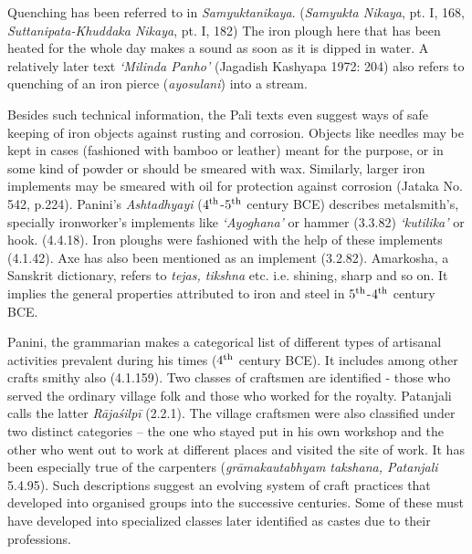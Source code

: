 Quenching has been referred to in {\it Samyuktanikaya}. ({\it Samyukta Nikaya}, pt. I, 168, {\it Suttanipata-Khuddaka Nikaya}, pt. I, 182) The iron plough here that has been heated for the whole day makes a sound as soon as it is dipped in water. A relatively later text {\it ‘Milinda Panho’} (Jagadish Kashyapa 1972: 204) also refers to quenching of an iron pierce ({\it ayosulani}) into a stream.

Besides such technical information, the Pali texts even suggest ways of safe keeping of iron objects against rusting and corrosion. Objects like needles may be kept in cases (fashioned with bamboo or leather) meant for the purpose, or in some kind of powder or should be smeared with wax. Similarly, larger iron implements may be smeared with oil for protection against corrosion (Jataka No. 542, p.224). Panini’s {\it Ashtadhyayi} ($4^{\rm th}$-$5^{\rm th}$ century BCE) describes metalsmith’s, specially ironworker’s implements like {\it ‘Ayoghana’} or hammer (3.3.82) {\it ‘kutilika’} or hook. (4.4.18). Iron ploughs were fashioned with the help of these implements (4.1.42). Axe has also been mentioned as an implement (3.2.82). Amarkosha, a Sanskrit dictionary, refers to {\it tejas, tikshna} etc. i.e. shining, sharp and so on. It implies the general properties attributed to iron and steel in $5^{\rm th}$-$4^{\rm th}$ century BCE.

Panini, the grammarian makes a categorical list of different types of artisanal activities prevalent during his times ($4^{\rm th}$ century BCE). It includes among other crafts smithy also (4.1.159). Two classes of craftsmen are identified - those who served the ordinary village folk and those who worked for the royalty. Patanjali calls the latter {\it Rājaśilpī} (2.2.1). The village craftsmen were also classified under two distinct categories – the one who stayed put in his own workshop and the other who went out to work at different places and visited the site of work. It has been especially true of the carpenters ({\it grāmakautabhyam takshana, Patanjali} 5.4.95). Such descriptions suggest an evolving system of craft practices that developed into organised groups into the successive centuries. Some of these must have developed into specialized classes later identified as castes due to their professions. 



